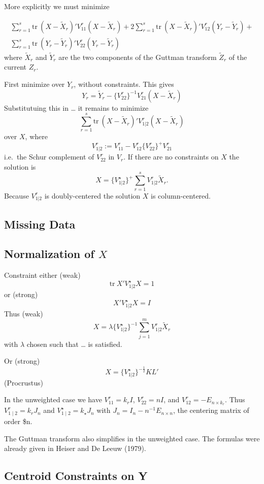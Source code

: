 \documentclass[
  12pt,
]{article}
\begin{document}
More explicitly we must minimize

\begin{multline}
\sum_{r=1}^s\text{tr}\ (X-\tilde X_r)'V_{11}^r(X-\tilde X_r)+2\sum_{r=1}^s\text{tr}\ (X-\tilde X_r)'V_{12}^r(Y_r-\tilde Y_r)+\\\sum_{r=1}^s\text{tr}\ (Y_r-\tilde Y_r)'V_{22}^r(Y_r-\tilde Y_r)
\end{multline}
where \(\tilde X_r\) and \(\tilde Y_r\) are the two components of the Guttman
transform \(\tilde Z_r\) of the current \(Z_r\).

First minimize over \(Y_r\), without constraints. This gives
\[
Y_r=\tilde Y_r-\{V_{22}^r\}^{-1}V_{21}^r(X-\tilde X_r)
\]
Substitutuing this in \ldots{} it remains to minimize
\[
\sum_{r=1}^s\text{tr}\ (X-\tilde X_r)'V_{1|2}^r(X-\tilde X_r)
\]
over \(X\), where
\[
V_{1|2}^r:=V_{11}^r-V_{12}^r\{V_{22}^r\}^+V_{21}^r
\]
i.e.~the Schur complement of \(V_{22}^r\) in \(V_r\). If there are no constraints on \(X\) the solution is
\[
X=\{V_{1|2}^\star\}^+\sum_{r=1}^sV_{1|2}^r\tilde X_r.
\]
Because \(V_{1|2}^r\) is doubly-centered the solution \(X\) is column-centered.

\subsection{Missing Data}\label{missing-data}

\subsection{\texorpdfstring{Normalization of \(X\)}{Normalization of X}}\label{normalization-of-x}

Constraint either (weak)
\[
\text{tr}\ X'V_{1|2}^\star X = 1
\]
or (strong)
\[
X'V_{1|2}^\star X = I
\]
Thus (weak)
\[
X=\lambda\{V_{1|2}^\star\}^{-1}\sum_{j=1}^mV_{1|2}^r\tilde X_r
\]
with \(\lambda\) chosen such that \ldots{} is satisfied.

Or (strong)
\[
X=\{V_{1|2}^\star\}^{-\frac12}KL'
\]
(Procrustus)

In the unweighted case we have \(V_{11}^r=k_rI\), \(V_{22}^r=nI\), and
\(V_{12}^r=-E_{n\times k_r}\). Thus
\(V_{1\mid2}^r=k_rJ_n\) and \(V_{1\mid 2}^\star=k_\star J_n\)
with \(J_n=I_n-n^{-1}E_{n\times n}\), the centering matrix of order \$n.

The Guttman transform also simplifies in the unweighted case. The formulas were already given in Heiser and De Leeuw (1979).

\subsection{Centroid Constraints on Y}\label{centroid-constraints-on-y}
\end{document}
